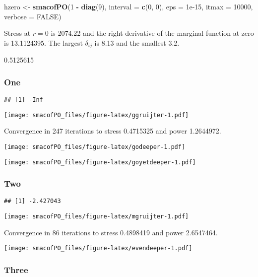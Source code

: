 \documentclass[
  12pt,
]{article}
\newenvironment{Shaded}{\begin{snugshade}}{\end{snugshade}}
\newcommand{\AttributeTok}[1]{\textcolor[rgb]{0.13,0.29,0.53}{#1}}
\newcommand{\ConstantTok}[1]{\textcolor[rgb]{0.56,0.35,0.01}{#1}}
\newcommand{\DecValTok}[1]{\textcolor[rgb]{0.00,0.00,0.81}{#1}}
\newcommand{\FloatTok}[1]{\textcolor[rgb]{0.00,0.00,0.81}{#1}}
\newcommand{\FunctionTok}[1]{\textcolor[rgb]{0.13,0.29,0.53}{\textbf{#1}}}
\newcommand{\NormalTok}[1]{#1}
\newcommand{\OtherTok}[1]{\textcolor[rgb]{0.56,0.35,0.01}{#1}}
\newcommand{\SpecialCharTok}[1]{\textcolor[rgb]{0.81,0.36,0.00}{\textbf{#1}}}
\begin{document}
\begin{Shaded}
\begin{Highlighting}[]
\NormalTok{hzero }\OtherTok{\textless{}{-}} \FunctionTok{smacofPO}\NormalTok{(}\DecValTok{1} \SpecialCharTok{{-}} \FunctionTok{diag}\NormalTok{(}\DecValTok{9}\NormalTok{), }\AttributeTok{interval =} \FunctionTok{c}\NormalTok{(}\DecValTok{0}\NormalTok{, }\DecValTok{0}\NormalTok{), }\AttributeTok{eps =} \FloatTok{1e{-}15}\NormalTok{, }\AttributeTok{itmax =} \DecValTok{10000}\NormalTok{, }\AttributeTok{verbose =} \ConstantTok{FALSE}\NormalTok{)}
\end{Highlighting}
\end{Shaded}

Stress at \(r=0\) is 2074.22 and the right derivative of the marginal function at zero is 13.1124395. The largest \(\delta_{ij}\) is 8.13 and the smallest 3.2.

0.5125615

\subsubsection{One}\label{one}

\begin{verbatim}
## [1] -Inf
\end{verbatim}

\texttt{[image: smacofPO\_files/figure-latex/ggruijter-1.pdf]}

Convergence in 247 iterations to stress 0.4715325 and power 1.2644972.

\texttt{[image: smacofPO\_files/figure-latex/godeeper-1.pdf]}

\texttt{[image: smacofPO\_files/figure-latex/goyetdeeper-1.pdf]}

\subsubsection{Two}\label{two}

\begin{verbatim}
## [1] -2.427043
\end{verbatim}

\texttt{[image: smacofPO\_files/figure-latex/mgruijter-1.pdf]}

Convergence in 86 iterations to stress 0.4898419 and power 2.6547464.

\texttt{[image: smacofPO\_files/figure-latex/evendeeper-1.pdf]}

\subsubsection{Three}\label{three}
\end{document}
